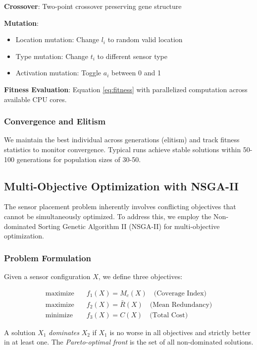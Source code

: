 \textbf{Crossover}: Two-point crossover preserving gene structure

\textbf{Mutation}: 
\begin{itemize}
\item Location mutation: Change $l_i$ to random valid location
\item Type mutation: Change $t_i$ to different sensor type
\item Activation mutation: Toggle $a_i$ between 0 and 1
\end{itemize}

\textbf{Fitness Evaluation}: Equation \ref{eq:fitness} with parallelized computation across available CPU cores.

\subsubsection{Convergence and Elitism}

We maintain the best individual across generations (elitism) and track fitness statistics to monitor convergence. Typical runs achieve stable solutions within 50-100 generations for population sizes of 30-50.

\subsection{Multi-Objective Optimization with NSGA-II}

The sensor placement problem inherently involves conflicting objectives that cannot be simultaneously optimized. To address this, we employ the Non-dominated Sorting Genetic Algorithm II (NSGA-II) \cite{deb2002fast} for multi-objective optimization.

\subsubsection{Problem Formulation}

Given a sensor configuration $X$, we define three objectives:

\begin{align}
\text{maximize} \quad & f_1(X) = M_c(X) \quad \text{(Coverage Index)} \label{eq:obj1}\\
\text{maximize} \quad & f_2(X) = \bar{R}(X) \quad \text{(Mean Redundancy)} \label{eq:obj2}\\
\text{minimize} \quad & f_3(X) = C(X) \quad \text{(Total Cost)} \label{eq:obj3}
\end{align}

A solution $X_1$ \textit{dominates} $X_2$ if $X_1$ is no worse in all objectives and strictly better in at least one. The \textit{Pareto-optimal front} is the set of all non-dominated solutions.

